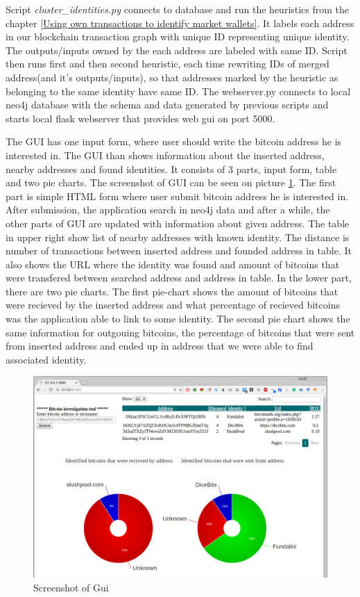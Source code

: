 \documentclass[
  digital, %
  table,   %
  lof,     %
  lot,     %
  oneside
]{fithesis3}
\begin{document}
Script \emph{cluster\_identities.py} connects to database and run the heuristics from the chapter
\ref{Using own transactions to identify market wallets}.
It labels each address in our blockchain transaction graph
with unique ID representing unique identity. The outputs/inputs owned by the each address are labeled
with same ID. Script then runs first and then second heuristic,
each time rewriting IDs of merged address(and it's outputs/inputs), so that 
addresses marked by the heuristic as belonging to the same identity have same ID.
The webserver.py connects to local neo4j database with the schema and data generated by previous
scripts and starts local flask webserver that provides web gui on port 5000.

The GUI has one input form, where user should write the bitcoin address he is interested in.
The GUI than shows information about the inserted address, nearby addresses and found identities.
It consists of 3 parts, input form, table and two pie charts. The screenshot of GUI can be seen on picture \ref{guiscreen}.
The first part is simple HTML form where user submit bitcoin address he is interested in.
After submission, the application search in neo4j data and after a while,
the other parts of GUI are updated with information about given address.
The table in upper right show list of nearby addresses with known identity. The distance is number of transactions
between inserted address and founded address in table. It also shows the URL where the identity was found
and amount of bitcoins that were transfered between searched address and address in table.
In the lower part, there are two pie charts. The first pie-chart shows the amount of bitcoins that were recieved by the inserted address
and what percentage of recieved bitcoins was the application able to link to some identity.
The second pie chart shows the same information for outgouing bitcoins, the percentage of bitcoins that were sent from inserted address
and ended up in address that we were able to find associated identity.

\begin{figure}[!htb]
\hspace*{-1cm}
    \centering
    \includegraphics[width=1\textwidth]{shot}
    \caption{Screenshot of Gui}
    \label{guiscreen}
\end{figure}
\end{document}
